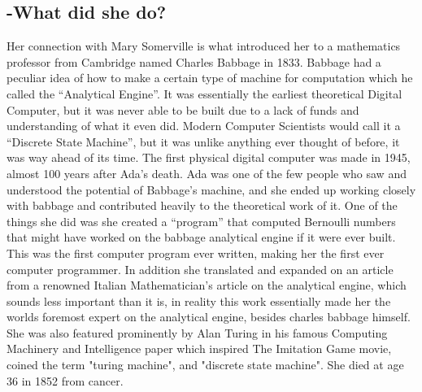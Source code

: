 \documentclass[16pt]{article}
\begin{document}
\subsection{-What did she do?}
Her connection with Mary Somerville is what introduced her to a mathematics professor from Cambridge named Charles Babbage in 1833. Babbage had a peculiar idea of how to make a certain type of machine for computation which he called the ``Analytical Engine''. It was essentially the earliest theoretical Digital Computer, but it was never able to be built due to a lack of funds and understanding of what it even did. Modern Computer Scientists would call it a ``Discrete State Machine'', but it was unlike anything ever thought of before, it was way ahead of its time. The first physical digital computer was made in 1945, almost 100 years after Ada's death. Ada was one of the few people who saw and understood the potential of Babbage's machine, and she ended up working closely with babbage and contributed heavily to the theoretical work of it. One of the things she did was she created a ``program'' that computed Bernoulli numbers that might have worked on the babbage analytical engine if it were ever built. This was the first computer program ever written, making her the first ever computer programmer. In addition she translated and expanded on an article from a renowned Italian Mathematician's article on the analytical engine, which sounds less important than it is, in reality this work essentially made her the worlds foremost expert on the analytical engine, besides charles babbage himself. She was also featured prominently by Alan Turing in his famous Computing Machinery and Intelligence paper which inspired The Imitation Game movie, coined the term "turing machine", and "discrete state machine". She died at age 36 in 1852 from cancer.
\end{document}
